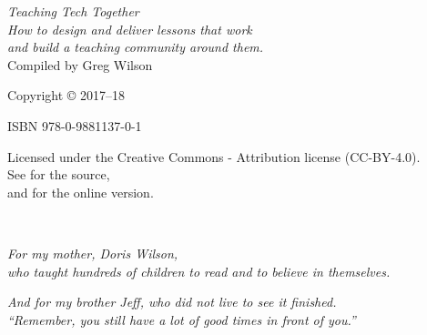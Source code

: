 \pagestyle{empty}

{\begingroup
  \raggedleft
  \vspace*{\baselineskip}

  {\Huge\itshape Teaching Tech Together}\\[\baselineskip]

  {\large\itshape
    How to design and deliver lessons that work \\
    and build a teaching community around them.
  }\\[0.2\textheight]

  {\large Compiled by Greg Wilson}\par

  \vfill

  {\large Copyright {\copyright} 2017--18}

  \vspace*{\baselineskip}

  {\large ISBN 978-0-9881137-0-1}

  \vspace*{\baselineskip}

  {\small
    Licensed under the Creative Commons - Attribution license (CC-BY-4.0).
    \\
    See {\repository} for the source,\\
    and {\website} for the online version.
  }

\endgroup}

\newpage

\pagestyle{empty}

~

\newpage

\pagestyle{empty}

\vspace*{1.5in}

\begin{center}
{\em
For my mother, Doris Wilson,\\
who taught hundreds of children to read and to believe in themselves.
}
\end{center}

\vspace*{3\baselineskip}

\begin{center}
{\em
And for my brother Jeff, who did not live to see it finished.\\
``Remember, you still have a lot of good times in front of you.''
}
\end{center}

\newpage

